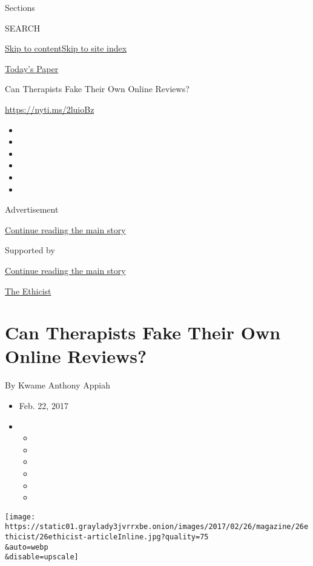 Sections

SEARCH

\protect\hyperlink{site-content}{Skip to
content}\protect\hyperlink{site-index}{Skip to site index}

\href{https://myaccount.nytimes3xbfgragh.onion/auth/login?response_type=cookie\&client_id=vi}{}

\href{https://www.nytimes3xbfgragh.onion/section/todayspaper}{Today's
Paper}

Can Therapists Fake Their Own Online Reviews?

\url{https://nyti.ms/2luioBz}

\begin{itemize}
\item
\item
\item
\item
\item
\item
\end{itemize}

Advertisement

\protect\hyperlink{after-top}{Continue reading the main story}

Supported by

\protect\hyperlink{after-sponsor}{Continue reading the main story}

\href{/column/the-ethicist}{The Ethicist}

\hypertarget{can-therapists-fake-their-own-online-reviews}{%
\section{Can Therapists Fake Their Own Online
Reviews?}\label{can-therapists-fake-their-own-online-reviews}}

By Kwame Anthony Appiah

\begin{itemize}
\item
  Feb. 22, 2017
\item
  \begin{itemize}
  \item
  \item
  \item
  \item
  \item
  \item
  \end{itemize}
\end{itemize}

\texttt{[image: https://static01.graylady3jvrrxbe.onion/images/2017/02/26/magazine/26ethicist/26ethicist-articleInline.jpg?quality=75\\\&auto=webp\\\&disable=upscale]}

